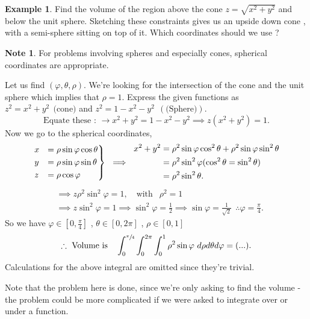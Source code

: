 \documentclass[
	12pt,
	]{article}
\newcommand{\vphi}{\varphi}
\theoremstyle{custom}
\theoremstyle{custom}
\theoremstyle{custom}
\theoremstyle{custom}
\theoremstyle{custom}
\theoremstyle{definition}
\newtheorem{example}{Example}[section]
\theoremstyle{example}
\newtheorem*{note}{Note}
\theoremstyle{note}
\theoremstyle{remark}
\theoremstyle{example}
\newcounter{theo}[section]\setcounter{theo}{0}
\numberwithin{equation}{subsection}
\begin{document}
  		\begin{example}
  			Find the volume of the region above the cone $z=\sqrt{x^{2}+y^{2}}$ and below the unit sphere. Sketching these constraints gives us an upside down cone , with a semi-sphere sitting on top of it. Which coordinates should we use ?
  			
  			\begin{note}
  				For problems involving spheres and especially cones, spherical coordinates are appropriate.
  			\end{note}
  			
  			\noindent Let us find $(\vphi, \theta, \rho)$. We're looking for the intersection of the cone and the unit sphere which implies that $\rho =1.$ Express the given functions as $z^{2} = x^{2} + y^{2} \ \ \text{(cone)}$ and $z^{2} = 1-x^{2} - y^{2} \ \ (\text{(Sphere)})$. 
  			$$ \text{Equate these : } \xrightarrow{} x^{2}+ y^{2} =1 -x^{2} - y^{2} \implies z(x^{2} + y^{2}) =1 .$$
  			Now we go to the spherical coordinates, 
  			\begin{equation*}
  				\begin{rcases}
  					x &= \rho \sin \vphi \cos \theta \\
  					y &= \rho \sin \vphi \sin \theta \\
  					z &= \rho \cos \vphi
  				\end{rcases} \ \implies  \ 
  				\begin{align}
  					x^{2} + y^{2} &= \rho^{2} \sin \vphi \cos^{2}\theta + \rho^{2} \sin \vphi \sin^{2} \theta \\
  					&= \rho^{2} \sin^{2} \vphi (\cos^{2} \theta = \sin^{2}\theta) \\
  					&= \rho^{2}\sin^{2}\theta.
  				\end{align}
  			\end{equation*}
  			\begin{align*}
  				&\implies z\rho^{2}\sin^{2}\vphi = 1 ,\quad \text{with } \ \ \rho^{2}=1 \\
  				&\implies z\sin^{2}\vphi =1 \implies \sin^{2}\vphi = \frac12 \implies \sin\vphi = \frac{1}{\sqrt{2}} \ \ \therefore \vphi = \frac{\pi}{4}.
  			\end{align*}
  			So we have $\vphi \in [0, \frac{\pi}{4}]$ , $\theta \in [0, 2\pi]$ , $\rho \in [0,1]$
  			$$ \therefore \ \text{Volume is } \ \ \int_{0}^{\sfrac{\pi}{4}} \int_{0}^{2\pi}\int_{0}^{1} \rho^{2}\sin\vphi \ d\rho d\theta d\vphi = (...).$$
  			Calculations for the above integral are omitted since they're trivial.
  			
  			\noindent Note that the problem here is done, since we're only asking to find the volume - the problem could be more complicated if we were asked to integrate over or under a function.
  		\end{example}
  		
\end{document}
